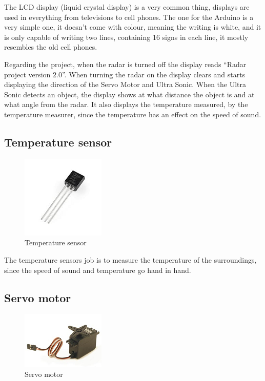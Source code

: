 The LCD display (liquid crystal display) is a very common thing, displays are used in everything from televisions to cell phones. The one for the Arduino is a very simple one, it doesn't come with colour, meaning the writing is white, and it is only capable of writing two lines, containing 16 signs in each line, it mostly resembles the old cell phones.   

Regarding the project, when the radar is turned off the display reads ``Radar project version $2.0$''. When turning the radar on the display clears and starts displaying the direction of the Servo Motor and Ultra Sonic. When the Ultra Sonic detects an object, the display shows at what distance the object is and at what angle from the radar. It also displays the temperature measured, by the temperature measurer, since the temperature has an effect on the speed of sound. 

\subsection{Temperature sensor}

\begin{figure} [h!]
\centering
  \includegraphics{fig/Temperaturesensor}
  \caption{Temperature sensor}
  \label{fig:temperaturesensor}
\end{figure} 

The temperature sensors job is to measure the temperature of the surroundings, since the speed of sound and temperature go hand in hand. 

\subsection{Servo motor}

\begin{figure} [h!]
\centering
  \includegraphics{fig/Servomotor}
  \caption{Servo motor}
  \label{fig:servo}
\end{figure} 

